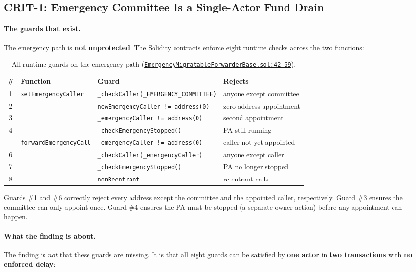 \documentclass[11pt,a4paper]{article}
\newcommand{\fwdRepoRoot}{https://github.com/anoma/anomapay-erc20-forwarder/blob/main/contracts/src}
\newcommand{\fwdrefR}[4]{\href{\fwdRepoRoot/#1#2\#L#3-L#4}{\nolinkurl{#2:#3-#4}}}
\begin{document}
\subsection{CRIT-1: Emergency Committee Is a Single-Actor Fund Drain}
\label{sec:crit1}

\paragraph{The guards that exist.}
The emergency path is \textbf{not unprotected}. The Solidity contracts
enforce eight runtime checks across the two functions:

\begin{table}[h]
\centering
\small
\caption{All runtime guards on the emergency path
  (\fwdrefR{bases/}{EmergencyMigratableForwarderBase.sol}{42}{69}).}
\label{tab:emergency-guards}
\begin{tabular}{@{}cp{3cm}p{5cm}p{4.2cm}@{}}
\toprule
\textbf{\#} & \textbf{Function} & \textbf{Guard} & \textbf{Rejects} \\
\midrule
1 & \texttt{setEmergency\-Caller}   & \texttt{\_checkCaller(\allowbreak{}\_EMERGENCY\_COMMITTEE)}
  & anyone except committee \\
2 & & \texttt{newEmergencyCaller != address(0)}
  & zero-address appointment \\
3 & & \texttt{\_emergencyCaller != address(0)}
  & second appointment \\
4 & & \texttt{\_checkEmergency\-Stopped()}
  & PA still running \\
\addlinespace
5 & \texttt{forwardEmergency\-Call} & \texttt{\_emergencyCaller != address(0)}
  & caller not yet appointed \\
6 & & \texttt{\_checkCaller(\allowbreak{}\_emergencyCaller)}
  & anyone except caller \\
7 & & \texttt{\_checkEmergency\-Stopped()}
  & PA no longer stopped \\
8 & & \texttt{nonReentrant}
  & re-entrant calls \\
\bottomrule
\end{tabular}
\end{table}

Guards \#1 and \#6 correctly reject every address except the committee and
the appointed caller, respectively. Guard \#3 ensures the committee can
only appoint once. Guard \#4 ensures the PA must be stopped (a separate
owner action) before any appointment can happen.

\paragraph{What the finding is about.}
The finding is \emph{not} that these guards are missing. It is that all
eight guards can be satisfied by \textbf{one actor} in \textbf{two
transactions} with \textbf{no enforced delay}:
\end{document}
